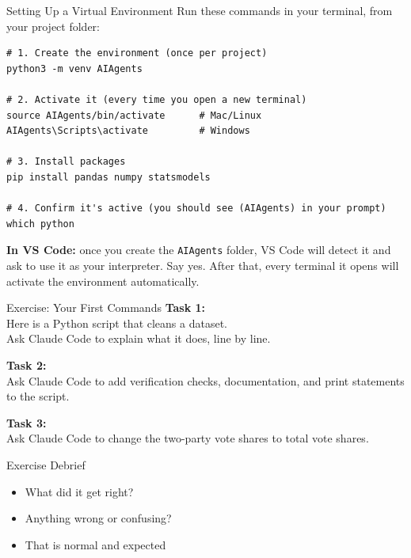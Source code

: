 \documentclass[aspectratio=169, 11pt]{beamer}
\begin{document}
\begin{frame}[fragile]{Setting Up a Virtual Environment}
  Run these commands in your terminal, from your project folder:

  \vspace{0.5em}
\begin{lstlisting}
# 1. Create the environment (once per project)
python3 -m venv AIAgents

# 2. Activate it (every time you open a new terminal)
source AIAgents/bin/activate      # Mac/Linux
AIAgents\Scripts\activate         # Windows

# 3. Install packages
pip install pandas numpy statsmodels

# 4. Confirm it's active (you should see (AIAgents) in your prompt)
which python
\end{lstlisting}

  \vspace{0.3em}
  \textbf{In VS Code:} once you create the \texttt{AIAgents} folder, VS Code will detect it and ask to use it as your interpreter. Say yes. After that, every terminal it opens will activate the environment automatically.
\end{frame}


\begin{frame}{Exercise: Your First Commands}
  \textbf{Task 1:}\\
  Here is a Python script that cleans a dataset.\\
  Ask Claude Code to explain what it does, line by line.

  \vspace{0.8em}
  \textbf{Task 2:}\\
  Ask Claude Code to add verification checks, documentation, and print statements to the script.

  \vspace{0.8em}
  \textbf{Task 3:}\\
  Ask Claude Code to change the two-party vote shares to total vote shares.
\end{frame}

\begin{frame}{Exercise Debrief}
  \begin{itemize}
    \item What did it get right?
    \item Anything wrong or confusing?
    \item That is normal and expected
  \end{itemize}
\end{frame}
\end{document}
